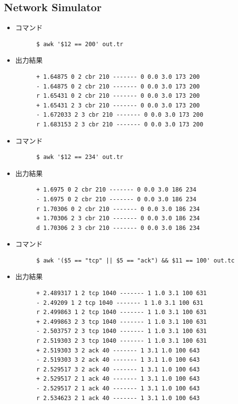 \documentclass[paper=a4, fontsize=10pt]{jlreq}
\begin{document}
\subsection{Network Simulator}
\begin{itemize}
  \item コマンド
    \begin{lstlisting}
      $ awk '$12 == 200' out.tr
    \end{lstlisting}

  \item 出力結果 
    \begin{lstlisting}
      + 1.64875 0 2 cbr 210 ------- 0 0.0 3.0 173 200
      - 1.64875 0 2 cbr 210 ------- 0 0.0 3.0 173 200
      r 1.65431 0 2 cbr 210 ------- 0 0.0 3.0 173 200
      + 1.65431 2 3 cbr 210 ------- 0 0.0 3.0 173 200
      - 1.672033 2 3 cbr 210 ------- 0 0.0 3.0 173 200
      r 1.683153 2 3 cbr 210 ------- 0 0.0 3.0 173 200
    \end{lstlisting}

  \item コマンド
    \begin{lstlisting}
      $ awk '$12 == 234' out.tr
    \end{lstlisting}

  \item 出力結果 
    \begin{lstlisting}
      + 1.6975 0 2 cbr 210 ------- 0 0.0 3.0 186 234
      - 1.6975 0 2 cbr 210 ------- 0 0.0 3.0 186 234
      r 1.70306 0 2 cbr 210 ------- 0 0.0 3.0 186 234
      + 1.70306 2 3 cbr 210 ------- 0 0.0 3.0 186 234
      d 1.70306 2 3 cbr 210 ------- 0 0.0 3.0 186 234
    \end{lstlisting}

  \item コマンド
    \begin{lstlisting}
      $ awk '($5 == "tcp" || $5 == "ack") && $11 == 100' out.tc
    \end{lstlisting}

  \item 出力結果 
    \begin{lstlisting}
      + 2.489317 1 2 tcp 1040 ------- 1 1.0 3.1 100 631
      - 2.49209 1 2 tcp 1040 ------- 1 1.0 3.1 100 631
      r 2.499863 1 2 tcp 1040 ------- 1 1.0 3.1 100 631
      + 2.499863 2 3 tcp 1040 ------- 1 1.0 3.1 100 631
      - 2.503757 2 3 tcp 1040 ------- 1 1.0 3.1 100 631
      r 2.519303 2 3 tcp 1040 ------- 1 1.0 3.1 100 631
      + 2.519303 3 2 ack 40 ------- 1 3.1 1.0 100 643
      - 2.519303 3 2 ack 40 ------- 1 3.1 1.0 100 643
      r 2.529517 3 2 ack 40 ------- 1 3.1 1.0 100 643
      + 2.529517 2 1 ack 40 ------- 1 3.1 1.0 100 643
      - 2.529517 2 1 ack 40 ------- 1 3.1 1.0 100 643
      r 2.534623 2 1 ack 40 ------- 1 3.1 1.0 100 643
    \end{lstlisting}


\end{itemize}
\end{document}
